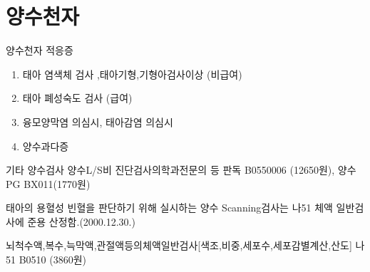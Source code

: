 \section{양수천자}
{양수천자 적응증
\begin{enumerate}[1.]\tightlist
\item 태아 염색체 검사 ,태아기형,기형아검사이상 (비급여)
\item 태아 폐성숙도 검사 (급여)
\item 융모양막염 의심시, 태아감염 의심시 
\item 양수과다증 
\end{enumerate}
}

\par
\medskip
\begin{commentbox}{기타 양수검사}
양수L/S비 진단검사의학과전문의 등 판독 B0550006 (12650원), 양수PG BX011(1770원)\par
태아의 용혈성 빈혈을 판단하기 위해 실시하는 양수 Scanning검사는 나51 체액 일반검사에 준용 산정함.(2000.12.30.)\par
뇌척수액,복수,늑막액,관절액등의체액일반검사[색조,비중,세포수,세포감별계산,산도] 나51 B0510 (3860원)
\end{commentbox}